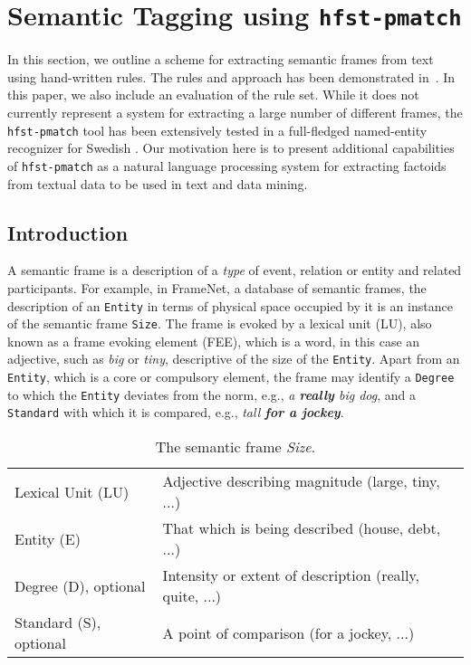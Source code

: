 \documentclass{llncs}
\begin{document}
\section{Semantic Tagging using {\tt hfst-pmatch}}\label{sec:sem-tagging}

In this section, we outline a scheme for extracting semantic frames from text
using hand-written rules. The rules and approach has been demonstrated in~\cite{hardwick/2015}. 
In this paper, we also include an evaluation of the rule set. While it does not currently 
represent a system for extracting a large number of different frames, 
the \verb+hfst-pmatch+ tool has been extensively tested in a full-fledged 
named-entity recognizer for Swedish \cite{Kokkinakis-Dimitrios2014-3}. 
Our motivation here is to present additional capabilities of 
\verb+hfst-pmatch+ as a natural language processing system for extracting 
factoids from textual data to be used in text and data mining.

\subsection{Introduction}

A semantic frame \cite{semantic-frame} is a description of a \emph{type} of event, relation or entity
and related participants. For example, in FrameNet, a database of semantic frames,
the description of an \verb+Entity+ in terms of physical space occupied by it is
an instance of the semantic frame \verb+Size+. The frame is evoked by
a lexical unit (LU), also known as a frame evoking element (FEE), which is a
word, in this case an adjective,
such as \emph{big} or \emph{tiny}, descriptive of the size of the \verb+Entity+.
Apart from an \verb+Entity+, which is a core or compulsory element, the
frame may identify a \verb+Degree+ to which the \verb+Entity+ deviates
from the norm, e.g., \emph{a \textbf{really} big dog}, and a \verb+Standard+ with
which it is compared, e.g., \emph{tall \textbf{for a jockey}}.

\begin{table}[h]
\begin{center}
  \begin{tabular}{ l | l}
\hline
Lexical Unit (LU) & Adjective describing magnitude (large, tiny, ...) \\
Entity (E) & That which is being described (house, debt, ...) \\
Degree (D), optional & Intensity or extent of description (really, quite, ...) \\
Standard (S), optional & A point of comparison (for a jockey, ...) \\
\hline
    \end{tabular}
    \caption{The semantic frame \emph{Size}.}
\end{center}
\end{table}
\end{document}
